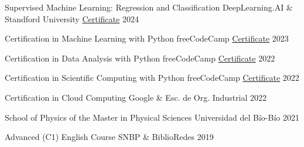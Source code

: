 

\begin{cvhonors}

  \cvhonor
    {Supervised Machine Learning: Regression and Classification} %
    {DeepLearning.AI \& Standford University} %
    {\href{https://www.coursera.org/account/accomplishments/verify/J4UMQZEMDBB8}{Certificate}} %
    {2024} %

  \cvhonor
    {Certification in Machine Learning with Python} %
    {freeCodeCamp} %
    {\href{https://www.freecodecamp.org/certification/_joacoh/machine-learning-with-python-v7}{Certificate}} %
    {2023} %

  \cvhonor
    {Certification in Data Analysis with Python} %
    {freeCodeCamp} %
    {\href{https://freecodecamp.org/certification/_joacoh/data-analysis-with-python-v7}{Certificate}} %
    {2022} %

  \cvhonor
    {Certification in Scientific Computing with Python} %
    {freeCodeCamp} %
    {\href{https://freecodecamp.org/certification/_joacoh/scientific-computing-with-python-v7}{Certificate}} %
    {2022} %

  \cvhonor
    {Certification in Cloud Computing} %
    {Google \& Esc. de Org. Industrial} %
    {} %
    {2022} %

  \cvhonor
    {School of Physics of the Master in Physical Sciences} %
    {Universidad del Bío-Bío} %
    {} %
    {2021} %

  \cvhonor
    {Advanced (C1) English Course} %
    {SNBP \& BiblioRedes} %
    {} %
    {2019} %

\end{cvhonors}
